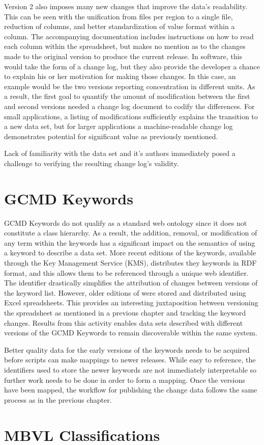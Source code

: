 Version 2 also imposes many new changes that improve the data's readability.
This can be seen with the unification from files per region to a single file, reduction of columns, and better standardization of value format within a column.
The accompanying documentation includes instructions on how to read each column within the spreadsheet, but makes no mention as to the changes made to the original version to produce the current release.
In software, this would take the form of a change log, but they also provide the developer a chance to explain his or her motivation for making those changes.
In this case, an example would be the two versions reporting concentration in different units.
As a result, the first goal to quantify the amount of modification between the first and second versions needed a change log document to codify the differences. For small applications, a listing of modifications sufficiently explains the transition to a new data set, but for larger applications a machine-readable change log demonstrates potential for significant value as previously mentioned.

Lack of familiarity with the data set and it's authors immediately posed a challenge to verifying the resulting change log's validity.

\section{GCMD Keywords}

GCMD Keywords do not qualify as a standard web ontology since it does not constitute a class hierarchy.
As a result, the addition, removal, or modification of any term within the keywords has a significant impact on the semantics of using a keyword to describe a data set.
More recent editions of the keywords, available through the Key Management Service (KMS), distributes they keywords in RDF format, and this allows them to be referenced through a unique web identifier.
The identifier drastically simplifies the attribution of changes between versions of the keyword list.
However, older editions of were stored and distributed using Excel spreadsheets.
This provides an interesting juxtaposition between versioning the spreadsheet as mentioned in a previous chapter and tracking the keyword changes.
Results from this activity enables data sets described with different versions of the GCMD Keywords to remain discoverable within the same system.

Better quality data for the early versions of the keywords needs to be acquired before scripts can make mappings to newer releases.
While easy to reference, the identifiers used to store the newer keywords are not immediately interpretable so further work needs to be done in order to form a mapping.
Once the versions have been mapped, the workflow for publishing the change data follows the same process as in the previous chapter.

\section{MBVL Classifications}